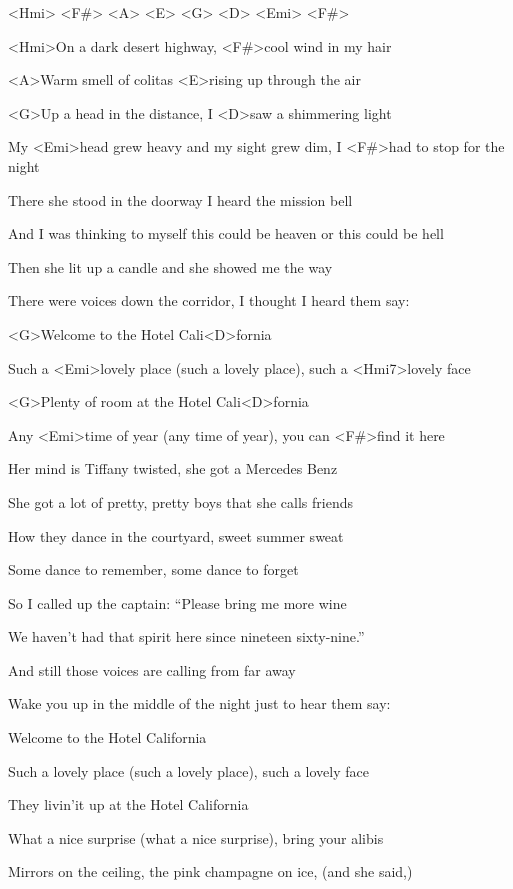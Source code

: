 

<Hmi> <F#> <A> <E> <G> <D> <Emi> <F#>

\zs
<Hmi>On a dark desert highway,
<F#>cool wind in my hair

<A>Warm smell of colitas
<E>rising up through the air

<G>Up a head in the distance,
I <D>saw a shimmering light

My <Emi>head grew heavy and my sight grew dim,
I <F#>had to stop for the night
\ks

\zs
There she stood in the doorway
I heard the mission bell

And I was thinking to myself
this could be heaven or this could be hell

Then she lit up a candle
and she showed me the way

There were voices down the corridor,
I thought I heard them say:
\ks

\zr
<G>Welcome to the Hotel Cali<D>fornia

Such a <Emi>lovely place (such a lovely place),
such a <Hmi7>lovely face

<G>Plenty of room at the Hotel Cali<D>fornia

Any <Emi>time of year (any time of year),
you can <F#>find it here
\kr

\zs
Her mind is Tiffany twisted,
she got a Mercedes Benz

She got a lot of pretty,
pretty boys that she calls friends

How they dance in the courtyard,
sweet summer sweat

Some dance to remember,
some dance to forget
\ks

\zs
So I called up the captain:
``Please bring me more wine

We haven't had that spirit
here since nineteen sixty-nine.''

And still those voices are calling from far away

Wake you up in the middle of the night
just to hear them say:
\ks

\zr
Welcome to the Hotel California

Such a lovely place (such a lovely place),
such a lovely face

They livin'it up at the Hotel California

What a nice surprise (what a nice surprise),
bring your alibis
\kr

\zs
Mirrors on the ceiling,
the pink champagne on ice, (and she said,)

